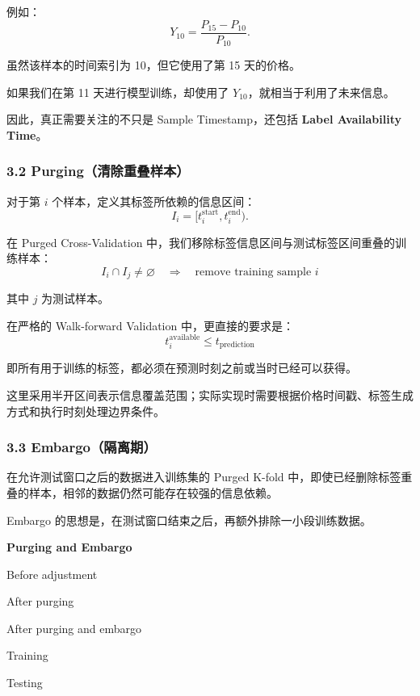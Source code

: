 例如：
\[Y_{10}=\frac{P_{15}-P_{10}}{P_{10}}.\]

虽然该样本的时间索引为 10，但它使用了第 15 天的价格。

如果我们在第 11 天进行模型训练，却使用了 \(Y_{10}\)，就相当于利用了未来信息。

因此，真正需要关注的不只是 Sample Timestamp，还包括 \textbf{Label Availability Time}。

\hypertarget{part-2-27-0001-purgingux6e05ux9664ux91cdux53e0ux6837ux672c}{%
\subsubsection{3.2 Purging（清除重叠样本）}\label{part-2-27-0001-purgingux6e05ux9664ux91cdux53e0ux6837ux672c}}

对于第 \(i\) 个样本，定义其标签所依赖的信息区间：
\[I_i=[t_i^{\mathrm{start}},t_i^{\mathrm{end}}).\]

在 Purged Cross-Validation 中，我们移除标签信息区间与测试标签区间重叠的训练样本：
\[\boxed{
I_i\cap I_j\neq\varnothing
\quad\Longrightarrow\quad
\text{remove training sample }i
}\]

其中 \(j\) 为测试样本。

在严格的 Walk-forward Validation 中，更直接的要求是：
\[\boxed{
t_i^{\mathrm{available}}
\leq t_{\mathrm{prediction}}
}\]

即所有用于训练的标签，都必须在预测时刻之前或当时已经可以获得。

这里采用半开区间表示信息覆盖范围；实际实现时需要根据价格时间戳、标签生成方式和执行时刻处理边界条件。

\hypertarget{part-2-27-0001-embargoux9694ux79bbux671f}{%
\subsubsection{3.3 Embargo（隔离期）}\label{part-2-27-0001-embargoux9694ux79bbux671f}}

在允许测试窗口之后的数据进入训练集的 Purged K-fold 中，即使已经删除标签重叠的样本，相邻的数据仍然可能存在较强的信息依赖。

Embargo 的思想是，在测试窗口结束之后，再额外排除一小段训练数据。

\textbf{Purging and Embargo}

Before adjustment

After purging

After purging and embargo

Training

Testing


